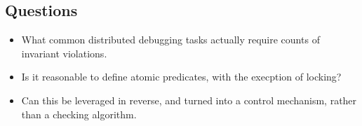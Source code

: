 \subsection{Questions}

\begin{itemize}
    
    \item What common distributed debugging tasks actually require counts of invariant violations.

    \item Is it reasonable to define atomic predicates, with the execption of locking?

    \item Can this be leveraged in reverse, and turned into a control mechanism, rather than a checking algorithm.

\end{itemize}


